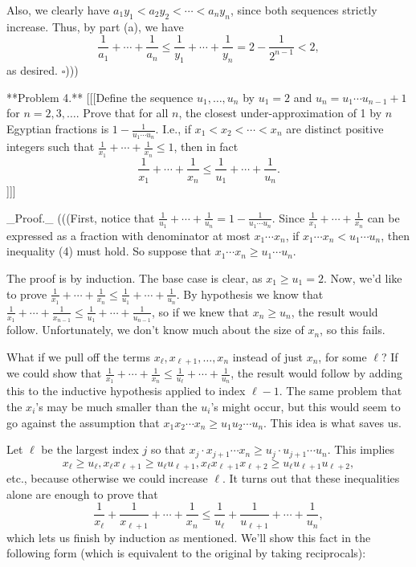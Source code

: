 Also, we clearly have $a_1 y_1 < a_2 y_2 < \cdots < a_n y_n$, since both sequences strictly increase. Thus, by part (a), we have  
\[ \frac{1}{a_1} + \cdots + \frac{1}{a_n} \leq \frac{1}{y_1} + \cdots + \frac{1}{y_n} = 2 - \frac{1}{2^{n-1}} < 2, \]  
as desired. $\square$)))

**Problem 4.**  [[[Define the sequence $u_1, \ldots, u_n$ by $u_1 = 2$ and $u_n = u_1 \cdots u_{n-1} + 1$ for $n = 2, 3, \ldots.$ Prove that for all $n$, the closest under-approximation of 1 by $n$ Egyptian fractions is $1 - \frac{1}{u_1 \cdots u_n}$. I.e., if $x_1 < x_2 < \cdots < x_n$ are distinct positive integers such that $\frac{1}{x_1} + \cdots + \frac{1}{x_n} \leq 1$, then in fact  
\[ \frac{1}{x_1} + \cdots + \frac{1}{x_n} \leq \frac{1}{u_1} + \cdots + \frac{1}{u_n}. \tag{4} \]  ]]]

_Proof._ (((First, notice that $\frac{1}{u_1} + \cdots + \frac{1}{u_n} = 1 - \frac{1}{u_1 \cdots u_n}$. Since $\frac{1}{x_1} + \cdots + \frac{1}{x_n}$ can be expressed as a fraction with denominator at most $x_1 \cdots x_n$, if $x_1 \cdots x_n < u_1 \cdots u_n$, then inequality (4) must hold. So suppose that $x_1 \cdots x_n \geq u_1 \cdots u_n$.  

The proof is by induction. The base case is clear, as $x_1 \geq u_1 = 2$. Now, we'd like to prove $\frac{1}{x_1} + \cdots + \frac{1}{x_n} \leq \frac{1}{u_1} + \cdots + \frac{1}{u_n}$. By hypothesis we know that $\frac{1}{x_1} + \cdots + \frac{1}{x_{n-1}} \leq \frac{1}{u_1} + \cdots + \frac{1}{u_{n-1}}$, so if we knew that $x_n \geq u_n$, the result would follow. Unfortunately, we don't know much about the size of $x_n$, so this fails.  

What if we pull off the terms $x_{\ell}, x_{\ell + 1}, \ldots, x_n$ instead of just $x_n$, for some $\ell$? If we could show that $\frac{1}{x_1} + \cdots + \frac{1}{x_n} \leq \frac{1}{u_{\ell}} + \cdots + \frac{1}{u_n}$, the result would follow by adding this to the inductive hypothesis applied to index $\ell - 1$. The same problem that the $x_i$'s may be much smaller than the $u_i$'s might occur, but this would seem to go against the assumption that $x_1 x_2 \cdots x_n \geq u_1 u_2 \cdots u_n$. This idea is what saves us.  

Let $\ell$ be the largest index $j$ so that $x_j \cdot x_{j+1} \cdots x_n \geq u_j \cdot u_{j+1} \cdots u_n$. This implies  
\[ x_{\ell} \geq u_{\ell}, x_{\ell} x_{\ell + 1} \geq u_{\ell} u_{\ell + 1}, x_{\ell} x_{\ell + 1} x_{\ell + 2} \geq u_{\ell} u_{\ell + 1} u_{\ell + 2}, \]  
etc., because otherwise we could increase $\ell$. It turns out that these inequalities alone are enough to prove that  
\[ \frac{1}{x_{\ell}} + \frac{1}{x_{\ell + 1}} + \cdots + \frac{1}{x_n} \leq \frac{1}{u_{\ell}} + \frac{1}{u_{\ell + 1}} + \cdots + \frac{1}{u_n}, \]
which lets us finish by induction as mentioned. We'll show this fact in the following form (which is equivalent to the original by taking reciprocals):  



